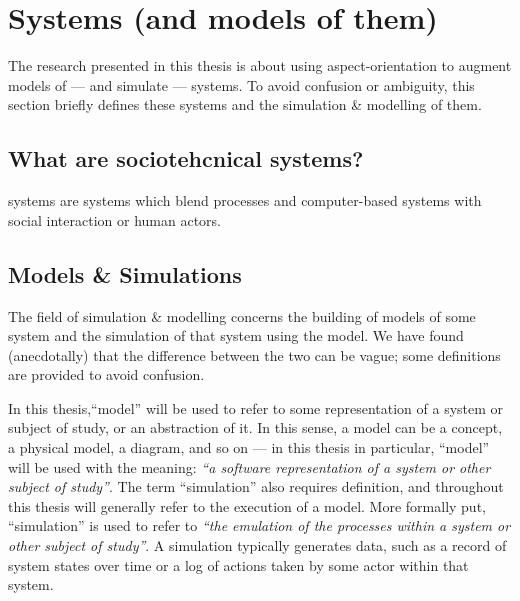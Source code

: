 \section{\SocioTechnical Systems (and models of them)}


The research presented in this thesis is about using aspect-orientation to
augment models of --- and simulate --- \sociotechnical systems. To avoid
confusion or ambiguity, this section briefly defines these systems and the
simulation \& modelling of them. 

\subsection{What are sociotehcnical systems?}

\Sociotechnical systems are systems which blend processes and computer-based
systems with social interaction or human actors. 


\subsection{Models \& Simulations}

The field of simulation \& modelling concerns the building of models of some
system and the simulation of that system using the model. We have found
(anecdotally) that the difference between the two can be vague; some definitions
are provided to avoid confusion.

In this thesis,``model'' will be used to refer to some representation of a
system or subject of study, or an abstraction of it. In this sense, a model can
be a concept, a physical model, a diagram, and so on --- in this thesis in
particular, ``model'' will be used with the meaning: \emph{``a software
  representation of a system or other subject of study''}. The term
``simulation'' also requires definition, and throughout this thesis will
generally refer to the execution of a model. More formally put, ``simulation''
is used to refer to \emph{``the emulation of the processes within a system or
  other subject of study''}. A simulation typically generates data, such as a
record of system states over time or a log of actions taken by some actor within
that system.

